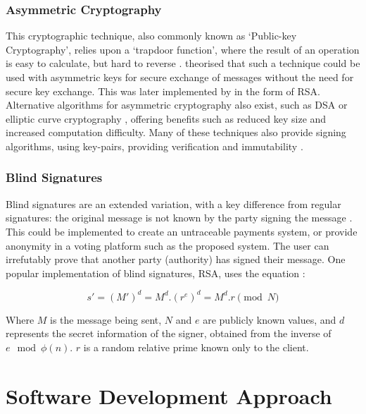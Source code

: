 \documentclass{article}
\begin{document}
\subsubsection{Asymmetric Cryptography}

This cryptographic technique, also commonly known as `Public-key Cryptography', relies upon a `trapdoor function', where the result of an operation is easy to calculate, but hard to reverse \parencite{trapdoor}. \textcite{trapdoor} theorised that such a technique could be used with asymmetric keys for secure exchange of messages without the need for secure key exchange. This was later implemented by \textcite{rsa} in the form of RSA. Alternative algorithms for asymmetric cryptography also exist, such as DSA \parencite{dsa} or elliptic curve cryptography \parencite{ecc}, offering benefits such as reduced key size and increased computation difficulty. Many of these techniques also provide signing algorithms, using key-pairs, providing verification and immutability \parencite{rsa, dsa, ecc}.

\subsubsection{Blind Signatures}

Blind signatures are an extended variation, with a key difference from regular signatures: the original message is not known by the party signing the message \parencite{blindsignatures}. This could be implemented to create an untraceable payments system, or provide anonymity in a voting platform such as the proposed system. The user can irrefutably prove that another party (authority) has signed their message. One popular implementation of blind signatures, RSA, uses the equation \parencite{blindsignaturersa}:

\begin{equation}
s' = (M')^d = M^d . (r^e)^d = M^d . r \pmod N
\end{equation}

Where $M$ is the message being sent, $N$ and $e$ are publicly known values, and $d$ represents the secret information of the signer, obtained from the inverse of $e \mod \phi(n)$. $r$ is a random relative prime known only to the client.

\section{Software Development Approach}
\end{document}
